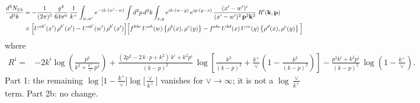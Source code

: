 \documentclass[9pt]{article}
\newcommand{\new}[1]{{\color{blue}#1}}
\numberwithin{equation}{section}
\begin{document}
\begin{align}
\frac{d^{3}N_{2\,b}}{d^{3}k} & = -\frac{1}{(2\pi)^{3}}\,\frac{g^{4}}{64\pi^{6}}\,\frac{1}{k^{+}}\int_{w,w'} e^{-ik\cdot(w'-w)}
\int d^{2}p\,d^{2}k\int_{x,y} e^{ik\cdot(w-y)}\,e^{ip\cdot(y-x)}\,\frac{(x'-w')^{i}}{(x'-w')^{2}\,\mathbf{p}^{2}\mathbf{k}^{2}}\;R^{i}(\mathbf{k},\mathbf{p})\notag\\
&\times\Big[U^{ab'}(x')\,\rho^{b'}(x')-U^{ab'}(w')\,\rho^{b'}(x')\Big]
\Big[f^{hbc}\,U^{ah}(w)\left\{\rho^{b}(x),\rho^{c}(y)\right\}-f^{abc}\,U^{bd}(x)\,U^{ce}(y)\left\{\rho^{d}(x),\rho^{e}(y)\right\}\Big]
\end{align}
where
\begin{align}
R^{i} =& -2k^{i}\log\left(\frac{p^{2}}{k^{2}+\frac{k^{+}}{\vee}\,p^{2}}\right)
+\frac{(2p^{2}-2\,k\cdot p+k^{2})\,k^{i}+k^{2}p^{i}}{(k-p)^{2}}\,
\log\left[\frac{k^{2}}{(k-p)^{2}}+\frac{k^{+}}{\vee}\left(1-\frac{k^{2}}{(k-p)^{2}}\right)\right]
-\frac{p^{2}k^{i}+k^{2}p^{i}}{(k-p)^{2}}\,\log\left(1-\frac{k^{+}}{\vee}\right).
\end{align}
\new{Part 1: the remaining $\log\big[1-\frac{k^+}{\vee}\big]\log\big[\frac{\vee}{k^+}\big]$ vanishes for $\vee\to\infty$; it is not a $\log\frac{\vee}{k^+}$ term. Part 2b: no change.}
\end{document}

